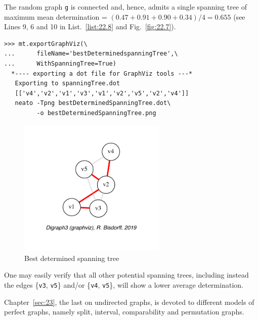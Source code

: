 The random graph \texttt{g} is connected and, hence, admits a single spanning tree of maximum mean determination = $(0.47 + 0.91 + 0.90 + 0.34)/4 = 0.655$ (see Lines 9, 6 and 10 in List.~\vref{list:22.8} and Fig.~\vref{fig:22.7}).
\begin{lstlisting}
>>> mt.exportGraphViz(\
...      fileName='bestDeterminedspanningTree',\
...      WithSpanningTree=True)
  *---- exporting a dot file for GraphViz tools ---*
   Exporting to spanningTree.dot
   [['v4','v2','v1','v3','v1','v2','v5','v2','v4']]
   neato -Tpng bestDeterminedSpanningTree.dot\
         -o bestDeterminedSpanningTree.png
\end{lstlisting}
\begin{figure}[ht]
\sidecaption[t]
\includegraphics[width=7cm]{Figures/22-7-bestDeterminedSpanningTree.pdf}
\caption{Best determined spanning tree} 
\label{fig:22.7}       %
\end{figure}

One may easily verify that all other potential spanning trees, including instead the edges \{\texttt{v3}, \texttt{v5}\} and/or \{\texttt{v4}, \texttt{v5}\}, will show a lower average determination.

\vspace{1cm}

Chapter~\ref{sec:23}, the last on undirected graphs, is devoted to different models of perfect graphs, namely split, interval, comparability and permutation graphs. 
 

%
%
